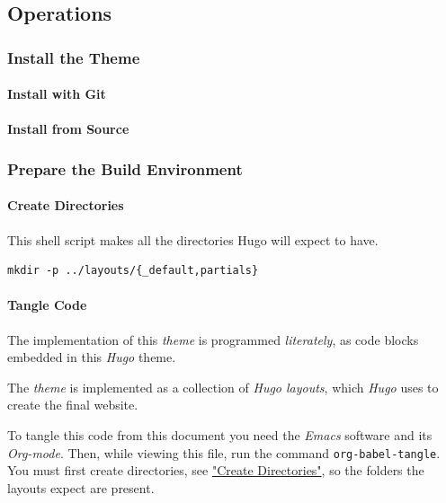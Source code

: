 \documentclass[11pt]{article}
\begin{document}
\subsection*{Operations}
\label{sec:org4b8415c}
\startcontents[level-2]
\subsubsection*{Install the Theme}
\label{sec:org4dc2d7f}
\paragraph*{Install with Git}
\label{sec:org92ac360}
\paragraph*{Install from Source}
\label{sec:org3a7013f}
\subsubsection*{Prepare the Build Environment}
\label{sec:org9cfae0f}
\startcontents[level-3]
\paragraph*{Create Directories}
\label{sec:org82777c6}
This shell script makes all the directories Hugo will expect to have.
\begin{verbatim}
mkdir -p ../layouts/{_default,partials}
\end{verbatim}

\paragraph*{Tangle Code}
\label{sec:org42bd2d3}
The implementation of this \emph{theme} is programmed \emph{literately}, as
code blocks embedded in this \emph{Hugo} theme.

The \emph{theme} is implemented as a collection of \emph{Hugo layouts},
which \emph{Hugo} uses to create the final website.

To tangle this code from this document you need the \emph{Emacs} software
and its \emph{Org-mode}. Then, while viewing this file, run the command
\texttt{org-babel-tangle}. You must first create directories, see \hyperref[sec:org82777c6]{"Create
Directories"}, so the folders the layouts expect are present.
\end{document}
